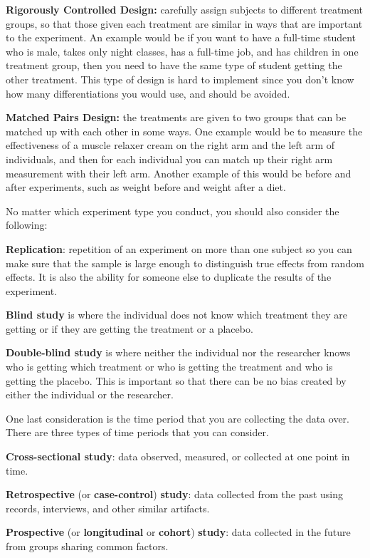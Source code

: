 \documentclass[]{book}
\begin{document}
\textbf{Rigorously Controlled Design:} carefully assign subjects to different
treatment groups, so that those given each treatment are similar in ways
that are important to the experiment. An example would be if you want to
have a full-time student who is male, takes only night classes, has a
full-time job, and has children in one treatment group, then you need to
have the same type of student getting the other treatment. This type of
design is hard to implement since you don't know how many
differentiations you would use, and should be avoided.

\textbf{Matched Pairs Design:} the treatments are given to two groups that
can be matched up with each other in some ways. One example would be to
measure the effectiveness of a muscle relaxer cream on the right arm and
the left arm of individuals, and then for each individual you can match
up their right arm measurement with their left arm. Another example of
this would be before and after experiments, such as weight before and
weight after a diet.

No matter which experiment type you conduct, you should also consider
the following:

\textbf{Replication}: repetition of an experiment on more than one subject so
you can make sure that the sample is large enough to distinguish true
effects from random effects. It is also the ability for someone else to
duplicate the results of the experiment.

\textbf{Blind study} is where the individual does not know which treatment
they are getting or if they are getting the treatment or a placebo.

\textbf{Double-blind study} is where neither the individual nor the
researcher knows who is getting which treatment or who is getting the
treatment and who is getting the placebo. This is important so that
there can be no bias created by either the individual or the researcher.

One last consideration is the time period that you are collecting the
data over. There are three types of time periods that you can consider.

\textbf{Cross-sectional study}: data observed, measured, or collected at one
point in time.

\textbf{Retrospective} (or \textbf{case-control}) \textbf{study}: data collected from
the past using records, interviews, and other similar artifacts.

\textbf{Prospective} (or \textbf{longitudinal} or \textbf{cohort}) \textbf{study}: data
collected in the future from groups sharing common factors.
\end{document}
